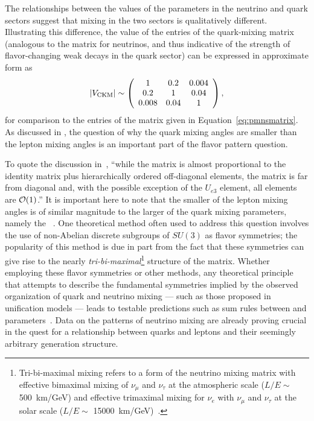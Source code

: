 The relationships between the values of the parameters in the neutrino
and quark sectors suggest that mixing in the two sectors is
qualitatively different. Illustrating this difference, the value of
the entries of the  %
quark-mixing matrix (analogous to the  matrix for
neutrinos, and thus indicative of the strength of flavor-changing weak
decays in the quark sector) can be expressed in approximate form as
\begin{equation}
|V_{\rm CKM}|\sim \left(\begin{array}{ccc} 1 & 0.2 & 0.004\\ 0.2 & 1 & 0.04 \\ 0.008 & 0.04 & 1\end{array} \right),
\label{eq:ckmmatrix}
\end{equation}
for comparison to the entries of the  matrix given in Equation~\ref{eq:pmnsmatrix}.
As discussed in \cite{King:2014nza}, the question of why the quark mixing angles are
smaller than the lepton mixing angles is an important part of the %
flavor pattern question. 

To quote the discussion in~\cite{deGouvea:2013onf}, ``while the 
matrix is almost proportional to the identity matrix plus
hierarchically ordered off-diagonal elements, the  matrix is far
from diagonal and, with the possible exception of the $U_{e3}$
element, all elements are ${\cal O}(1)$.''
It is important here to note that the smaller of the lepton
mixing angles is of similar magnitude to the larger of the quark mixing parameters, namely the ~\cite{Boucenna:2012xb}.
One theoretical method often used to address this question involves the use of non-Abelian discrete
subgroups of $SU(3)$ as flavor symmetries; the popularity of this method %
is due in part from
the fact that these symmetries can give rise to the nearly \emph{tri-bi-maximal}\footnote{Tri-bi-maximal mixing refers to a form of the neutrino mixing matrix with effective bimaximal mixing of $\nu_\mu$ and $\nu_\tau$
at the atmospheric scale ($L/E \sim$ \SI{500}{\km / \GeV}) and effective trimaximal
mixing for $\nu_e$ with $\nu_\mu$ and $\nu_\tau$ 
at the solar scale ($L/E \sim$ \SI{15000}{\km / \GeV})~\cite{Harrison:2002er}.} 
structure of the  matrix.
Whether employing these flavor symmetries or other methods,
any theoretical principle that attempts to describe the fundamental
symmetries implied by the observed organization of quark and neutrino
mixing --- such as those proposed in unification models --- leads to
testable predictions such as sum rules between  and 
parameters~\cite{King:2014nza,deGouvea:2013onf,Mohapatra:2005wg,Albright:2006cw}.
Data on the patterns of neutrino mixing 
are already proving crucial in the quest for a 
relationship between quarks and leptons and their seemingly arbitrary generation
structure.  

